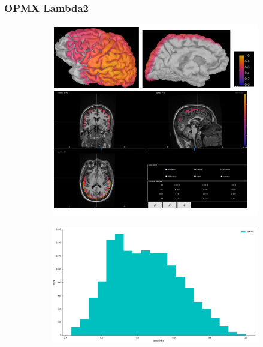 \documentclass{beamer}
\numberwithin{figure}{section}
\numberwithin{equation}{section}
\begin{document}

\section{}
\begin{frame}
 \frametitle{OPMX Lambda2}
  

 	\begin{figure}[h]
        \begin{subfigure}[h]{0.53\linewidth} 
            \includegraphics[width=\linewidth]{pictures/OPMX2}
            \label{fig:rdf_graph}
        \end{subfigure}       
        \begin{subfigure}[h]{0.45\linewidth} 
            \includegraphics[width=\linewidth]{pictures/opmx1}
            \label{fig:rdfs_graph}
        \end{subfigure}
    \end{figure}

  
\end{frame}
\end{document}

